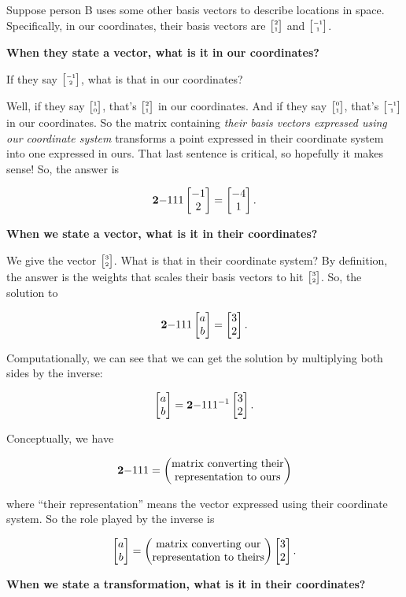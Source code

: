 Suppose person B uses some other basis vectors to describe locations in
space. Specifically, in our coordinates, their basis vectors are
$\tiny{\begin{bmatrix}2\\1\end{bmatrix}}$ and $\tiny{\begin{bmatrix}-1\\1\end{bmatrix}}$.


\textbf{When they state a vector, what is it in our coordinates?}

If they say $\tiny{\begin{bmatrix}-1\\2\end{bmatrix}}$, what is that in our coordinates?

Well, if they say $\tiny{\begin{bmatrix}1\\0\end{bmatrix}}$, that's $\tiny{\begin{bmatrix}2\\1\end{bmatrix}}$ in our coordinates. And
if they say $\tiny{\begin{bmatrix}0\\1\end{bmatrix}}$, that's $\tiny{\begin{bmatrix}-1\\1\end{bmatrix}}$ in our coordinates. So the
matrix containing \textit{their basis vectors expressed using our coordinate system}
transforms a point expressed in their coordinate system into one expressed in
ours. That last sentence is critical, so hopefully it makes sense! So, the answer is

$$
\mathbf{2}{-1}
    {1}{ 1} \begin{bmatrix}-1\\2\end{bmatrix} = \begin{bmatrix}-4\\1\end{bmatrix}.
$$


\textbf{When we state a vector, what is it in their coordinates?}

We give the vector $\tiny{\begin{bmatrix}3\\2\end{bmatrix}}$. What is that in their coordinate system? By
definition, the answer is the weights that scales their basis vectors to hit
$\tiny{\begin{bmatrix}3\\2\end{bmatrix}}$. So, the solution to

$$
\mathbf{2}{-1}
    {1}{1} \begin{bmatrix}a\\b\end{bmatrix} = \begin{bmatrix}3\\2\end{bmatrix}.
$$


Computationally, we can see that we can get the solution by multiplying both
sides by the inverse:

$$
\begin{bmatrix}a\\b\end{bmatrix} = \mathbf{2}{-1}
                  {1}{1}^{-1} \begin{bmatrix}3\\2\end{bmatrix}.
$$

Conceptually, we have

$$
\mathbf{2}{-1}
    {1}{1} =
\begin{pmatrix}\text{matrix converting their}\\\text{representation to ours} \\ \end{pmatrix}
$$

where ``their representation'' means the vector expressed using their coordinate
system. So the role played by the inverse is

$$
\begin{bmatrix}a\\b\end{bmatrix} =
\begin{pmatrix}\text{matrix converting our}\\\text{representation to theirs} \\ \end{pmatrix}
\begin{bmatrix}3\\2\end{bmatrix}.
$$

\textbf{When we state a transformation, what is it in their coordinates?}

